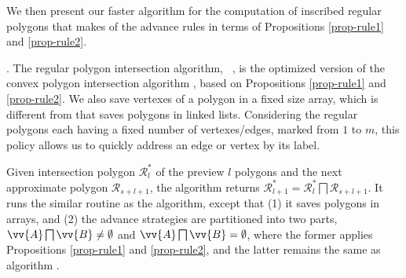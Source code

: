 We then present our faster algorithm for the computation of inscribed regular polygons that makes of the advance rules in terms of Propositions \ref{prop-rule1} and \ref{prop-rule2}.


.
The regular polygon intersection algorithm, \ie\ \rpia, is the optimized version of the convex polygon intersection algorithm \cpia, based on Propositions \ref{prop-rule1} and \ref{prop-rule2}. We also save vertexes of a polygon in a fixed size array, which is different from \cpia  that saves polygons in linked lists.
Considering the regular polygons each having a fixed number of vertexes/edges, marked from $1$ to $m$, this policy allows us to quickly address an edge or vertex by its label.

Given intersection polygon $\mathcal{R}^*_{l}$ of the preview $l$ polygons and the next approximate polygon $\mathcal{R}_{s+l+1}$, the algorithm \rpia returns $\mathcal{R}^*_{l+1}=\mathcal{R}^*_{l}  \bigsqcap \mathcal{R}_{s+l+1}$.
It runs the similar routine as the \cpia algorithm, except that (1) it saves polygons in arrays, and (2) the advance strategies are partitioned into two parts, \ie $\vv{A} \bigsqcap \vv{B} \ne \emptyset$ and $\vv{A} \bigsqcap \vv{B} = \emptyset$, where the former applies Propositions \ref{prop-rule1} and \ref{prop-rule2}, and the latter remains the same as algorithm \cpia.





